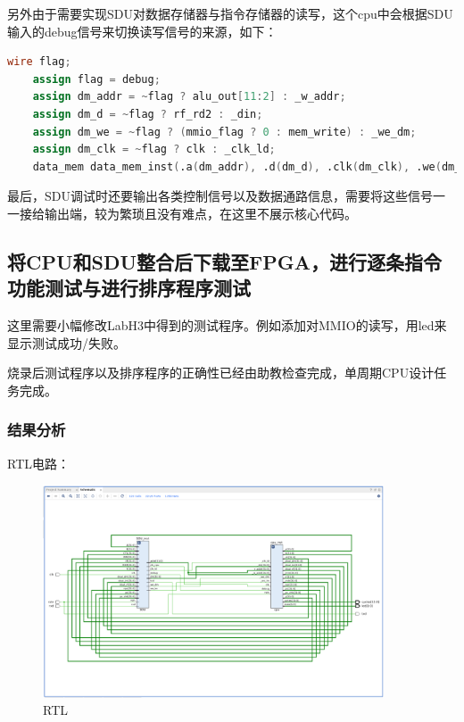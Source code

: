 \documentclass[a4paper]{article}
\begin{document}
另外由于需要实现SDU对数据存储器与指令存储器的读写，这个cpu中会根据SDU输入的debug信号来切换读写信号的来源，如下：
\begin{lstlisting}[language={verilog},title={reg.v}] 
    wire flag;
    assign flag = debug;
    assign dm_addr = ~flag ? alu_out[11:2] : _w_addr;
    assign dm_d = ~flag ? rf_rd2 : _din;
    assign dm_we = ~flag ? (mmio_flag ? 0 : mem_write) : _we_dm;
    assign dm_clk = ~flag ? clk : _clk_ld;
    data_mem data_mem_inst(.a(dm_addr), .d(dm_d), .clk(dm_clk), .we(dm_we), .spo(dm_rd));
 \end{lstlisting}

最后，SDU调试时还要输出各类控制信号以及数据通路信息，需要将这些信号一一接给输出端，较为繁琐且没有难点，在这里不展示核心代码。

\subsection{将CPU和SDU整合后下载至FPGA，进行逐条指令功能测试与进行排序程序测试}
这里需要小幅修改LabH3中得到的测试程序。例如添加对MMIO的读写，用led来显示测试成功/失败。

烧录后测试程序以及排序程序的正确性已经由助教检查完成，单周期CPU设计任务完成。

\subsubsection{结果分析}
RTL电路：
\begin{figure}[H]
    \centering
    \includegraphics[width=0.9\textwidth]{2.png}
    \caption{RTL}
    \label{fig:test1}
\end{figure}
\end{document}
